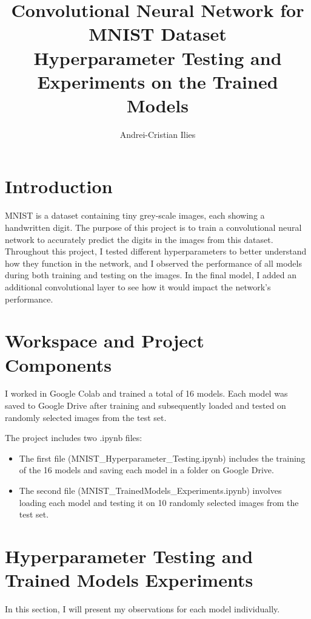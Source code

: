 \documentclass{article}
\title{Convolutional Neural Network for MNIST Dataset \\ Hyperparameter Testing and Experiments on the Trained Models}
\author{Andrei-Cristian Ilies}
\date{}
\begin{document}
\maketitle

\section*{Introduction}
\large{\hspace{1cm}MNIST is a dataset containing tiny grey-scale images, each showing a handwritten digit. The purpose of this project is to train a convolutional neural network to accurately predict the digits in the images from this dataset. Throughout this project, I tested different hyperparameters to better understand how they function in the network, and I observed the performance of all models during both training and testing on the images. In the final model, I added an additional convolutional layer to see how it would impact the network's performance.}

\section*{Workspace and Project Components}
\large{\hspace{1cm}I worked in Google Colab and trained a total of 16 models. Each model was saved to Google Drive after training and subsequently loaded and tested on randomly selected images from the test set.}

\large{\hspace{0.5cm}The project includes two .ipynb files:}

\begin{itemize}
  \item The first file (MNIST\_Hyperparameter\_Testing.ipynb) includes the training of the 16 models and saving each model in a folder on Google Drive.
  \item The second file (MNIST\_TrainedModels\_Experiments.ipynb) involves loading each model and testing it on 10 randomly selected images from the test set.
\end{itemize}

\section*{Hyperparameter Testing and Trained Models Experiments}
\large{\hspace{1cm}In this section, I will present my observations for each model individually.}
\end{document}
